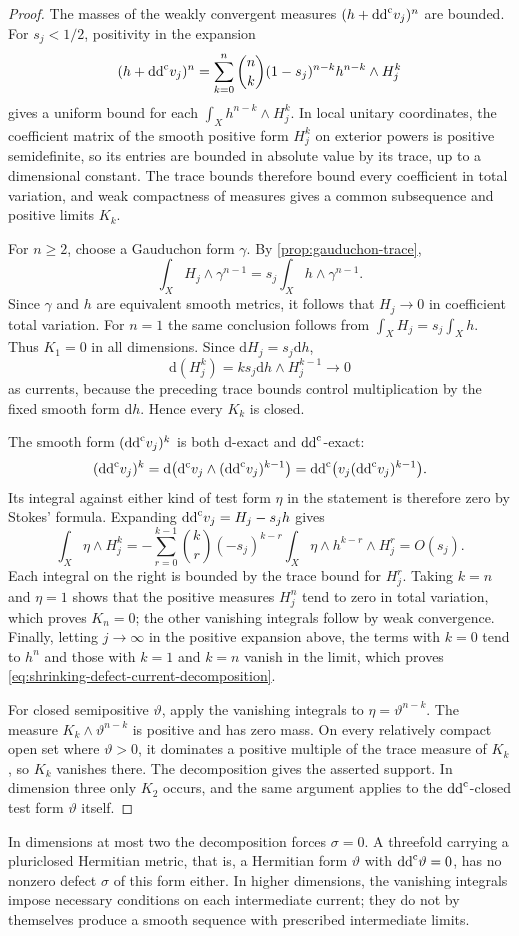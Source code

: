 \begin{proof}
The masses of the weakly convergent measures $(h+\mathrm{dd}^{\mathrm{c}} v_j)^n$ are bounded. For $s_j<1/2$, positivity in the expansion
\[
 (h+\mathrm{dd}^{\mathrm{c}} v_j)^n
 =\sum_{k=0}^n\binom nk(1-s_j)^{n-k}h^{n-k}\wedge H_j^k
\]
gives a uniform bound for each $\int_Xh^{n-k}\wedge H_j^k$. In local unitary coordinates, the coefficient matrix of the smooth positive form $H_j^k$ on exterior powers is positive semidefinite, so its entries are bounded in absolute value by its trace, up to a dimensional constant. The trace bounds therefore bound every coefficient in total variation, and weak compactness of measures gives a common subsequence and positive limits $K_k$.

For $n\geq2$, choose a Gauduchon form $\gamma$. By \cref{prop:gauduchon-trace},
\[
 \int_X H_j\wedge\gamma^{n-1}
 =s_j\int_Xh\wedge\gamma^{n-1}.
\]
Since $\gamma$ and $h$ are equivalent smooth metrics, it follows that $H_j\to0$ in coefficient total variation. For $n=1$ the same conclusion follows from $\int_XH_j=s_j\int_Xh$. Thus $K_1=0$ in all dimensions. Since $\mathrm{d}H_j=s_j\mathrm{d}h$,
\[
 \mathrm{d}(H_j^k)=ks_j\mathrm{d}h\wedge H_j^{k-1}\longrightarrow0
\]
as currents, because the preceding trace bounds control multiplication by the fixed smooth form $\mathrm{d}h$. Hence every $K_k$ is closed.

The smooth form $(\mathrm{dd}^{\mathrm{c}} v_j)^k$ is both $\mathrm{d}$-exact and $\mathrm{dd}^{\mathrm{c}}$-exact:
\[
 (\mathrm{dd}^{\mathrm{c}} v_j)^k
 =\mathrm{d}\bigl(\mathrm d^{\mathrm c} v_j\wedge(\mathrm{dd}^{\mathrm{c}} v_j)^{k-1}\bigr)
 =\mathrm{dd}^{\mathrm{c}}\bigl(v_j(\mathrm{dd}^{\mathrm{c}} v_j)^{k-1}\bigr).
\]
Its integral against either kind of test form $\eta$ in the statement is therefore zero by Stokes' formula. Expanding $\mathrm{dd}^{\mathrm{c}} v_j=H_j-s_jh$ gives
\[
 \int_X\eta\wedge H_j^k
 =-\sum_{r=0}^{k-1}\binom kr(-s_j)^{k-r}
      \int_X\eta\wedge h^{k-r}\wedge H_j^r
 =O(s_j).
\]
Each integral on the right is bounded by the trace bound for $H_j^r$. Taking $k=n$ and $\eta=1$ shows that the positive measures $H_j^n$ tend to zero in total variation, which proves $K_n=0$; the other vanishing integrals follow by weak convergence. Finally, letting $j\to\infty$ in the positive expansion above, the terms with $k=0$ tend to $h^n$ and those with $k=1$ and $k=n$ vanish in the limit, which proves \eqref{eq:shrinking-defect-current-decomposition}.

For closed semipositive $\vartheta$, apply the vanishing integrals to $\eta=\vartheta^{n-k}$. The measure $K_k\wedge\vartheta^{n-k}$ is positive and has zero mass. On every relatively compact open set where $\vartheta>0$, it dominates a positive multiple of the trace measure of $K_k$, so $K_k$ vanishes there. The decomposition gives the asserted support. In dimension three only $K_2$ occurs, and the same argument applies to the $\mathrm{dd}^{\mathrm{c}}$-closed test form $\vartheta$ itself.
\end{proof}

In dimensions at most two the decomposition forces $\sigma=0$. A threefold carrying a pluriclosed Hermitian metric, that is, a Hermitian form $\vartheta$ with $\mathrm{dd}^{\mathrm{c}}\vartheta=0$, has no nonzero defect $\sigma$ of this form either. In higher dimensions, the vanishing integrals impose necessary conditions on each intermediate current; they do not by themselves produce a smooth sequence with prescribed intermediate limits.
